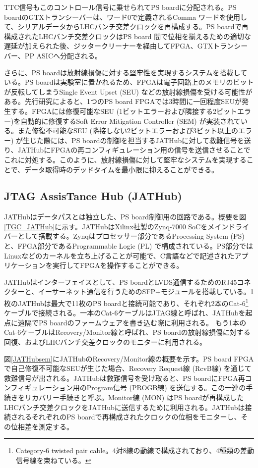     TTC信号もこのコントロール信号に乗せられてPS boardに分配される。PS boardのGTXトランシーバーは、ワード0で定義されるComma ワードを使用して、シリアルデータからLHCバンチ交差クロックを再構成する。PS boardで再構成されたLHCバンチ交差クロックはPS board 間で位相を揃えるための適切な遅延が加えられた後、ジッタークリーナーを経由してFPGA、GTXトランシーバー、PP ASICへ分配される。    

    さらに、PS boardは放射線損傷に対する堅牢性を実現するシステムを搭載している。PS boardは実験室に置かれるため、FPGAは電子回路上のメモリのビットが反転してしまうSingle Event Upset (SEU) などの放射線損傷を受ける可能性がある。先行研究\cite{PSB_SEU}によると、1つのPS board FPGAでは3時間に一回程度SEUが発生する。FPGAには修復可能なSEU  (1ビットエラーおよび隣接する2ビットエラー)を自動的に修復するSoft Error Mitigation Controller  (SEM) が実装されている。また修復不可能なSEU  (隣接しない2ビットエラーおよび3ビット以上のエラー) が生じた際には、PS boardの制御を担当するJATHubに対して救難信号を送り、JATHubにFPGAの再コンフィギュレーション用の信号を送信させることでこれに対処する。このように、放射線損傷に対して堅牢なシステムを実現することで、データ取得時のデッドタイムを最小限に抑えることができる。    

        \subsection*{JTAG AssisTance Hub (JATHub)}
    JATHubはデータパスとは独立した、PS board制御用の回路である。概要を図\ref{TGC_JATHub}に示す。JATHubはXilinx社製のZynq-7000 SoCをメインドライバーとして搭載する。Zynqはプロセッサー部分であるProcessing System  (PS) と、FPGA部分であるProgrammable Logic  (PL) で構成されている。PS部分ではLinuxなどのカーネルを立ち上げることが可能で、C言語などで記述されたアプリケーションを実行してFPGAを操作することができる。

    JATHubはインターフェイスとして、PS boardとLVDS通信するためのRJ45コネクターと、イーサーネット通信を行うためのSFP+モジュールを搭載している。1枚のJATHubは最大で11枚のPS boardと接続可能であり、それぞれ2本のCat-6\footnote{Category-6 twisted pair cable。4対8線の動線で構成されており、4種類の差動信号線を束ねている。}ケーブルで接続される。一本のCat-6ケーブルはJTAG線と呼ばれ、JATHubを起点に遠隔でPS boardのファームウェアを書き込む際に利用される。
    もう1本のCat-6ケーブルはRecovery/Monitor線と呼ばれ、PS boardの放射線損傷に対する回復、およびLHCバンチ交差クロックのモニターに利用される。
    
    図\ref{JATHubsem}にJATHubのRecovery/Monitor線の概要を示す。PS board FPGAで自己修復不可能なSEUが生じた場合、Recovery Request線 (RcvB線) を通じて救難信号が出される。JATHubは救難信号を受け取ると、PS boardにFPGA再コンフィギュレーション用のProgram信号 (PROGB線) を送信する。この一連の手続きをリカバリー手続きと呼ぶ。Monitor線 (MON) はPS boardが再構成したLHCバンチ交差クロックをJATHubに送信するために利用される。JATHubは接続されるそれぞれのPS boardで再構成されたクロックの位相をモニターし、その位相差を測定する。
    
